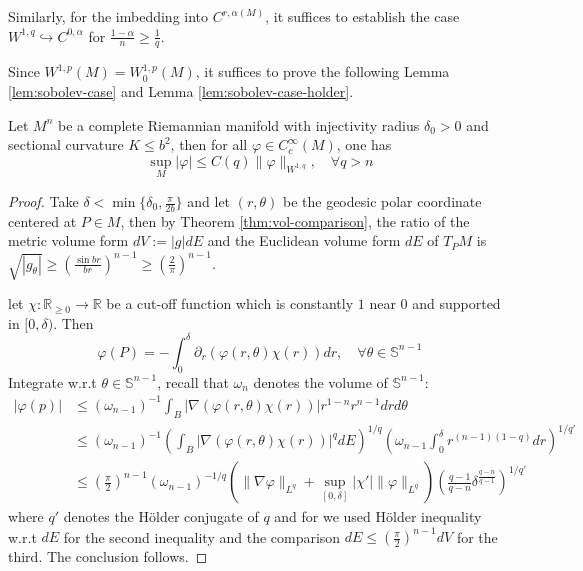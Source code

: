 \documentclass[11pt]{article}
\begin{document}
Similarly, for the imbedding into \(C^{r,\alpha(M)}\), it suffices to establish the case
\(W^{1,q} \hookrightarrow C^{0,\alpha}\) for \(\frac{1-\alpha}{n}\geq \frac{1}{q}\).


Since \(W^{1,p}(M) = W^{1,p}_0(M)\), it suffices to prove the following Lemma
\ref{lem:sobolev-case} and Lemma \ref{lem:sobolev-case-holder}.

\begin{lemma}[\( W^{1,q} \hookrightarrow C^0_B \)]
\label{lem:sobolev-case}
Let \(M^n\) be a complete Riemannian manifold with injectivity radius \(\delta_0>0\)
and sectional curvature \(K\leq b^2\), then for all \(\varphi\in C_c^\infty(M)\), one
has
\[
\sup_M |\varphi| \leq C(q) \|\varphi\|_{W^{1,q}},\quad \forall q>n
\]
\end{lemma}
\begin{proof}
Take \(\delta <\min \{\delta_0, \frac{\pi}{2b}\}\) and let \((r,\theta)\) be the
geodesic polar coordinate centered at \(P\in M\), then by Theorem
\ref{thm:vol-comparison}, the ratio of the metric volume form \(dV:= |g|dE\) and the Euclidean
volume form \(dE\) of \(T_P M\) is \(\sqrt{|g_\theta|}\geq \left(\frac{\sin
br}{br}\right)^{n-1}\geq (\frac{2}{\pi})^{n-1}\). 

let \(\chi: \mathbb{R}_{\geq 0} \longrightarrow \mathbb{R}\) be a cut-off function which
is constantly \(1\) near \(0\) and supported in \([0,\delta)\). Then
\[
 \varphi(P) = -\int_0^\delta
\partial_r\left(\varphi(r,\theta)\chi(r)\right)dr,\quad\forall \theta\in \mathbb{S}^{n-1}
\]
Integrate w.r.t \(\theta\in \mathbb{S}^{n-1}\), recall that \(\omega_n\) denotes the
volume of \(\mathbb{S}^{n-1}\):
\begin{equation*}
\begin{split}
 \left|\varphi(p)\right| &\leq (\omega_{n-1})^{-1} \int_B \left| \nabla(\varphi(r,\theta)\chi(r)) \right| r^{1-n}r^{n-1}drd\theta \\
			&\leq (\omega_{n-1})^{-1} \left(\int_B \left| \nabla(\varphi(r,\theta)\chi(r)) \right|^q dE\right)^{1/q}\left(\omega_{n-1}\int_0^\delta r^{(n-1)(1-q)}dr\right)^{1/q'}\\
			&\leq (\frac{\pi}{2})^{n-1} (\omega_{n-1})^{-1/q} \left(\|\nabla\varphi\|_{L^q} + \sup_{[0,\delta]}|\chi'|\|\varphi\|_{L^q} \right) \left(\frac{q-1}{q-n}\delta^{\frac{q-n}{q-1}}\right)^{1/q'}
\end{split}   
\end{equation*}
where   \(q'\) denotes the Hölder conjugate of \(q\) and for we used Hölder inequality
w.r.t \(dE\) for the second inequality and the comparison \(dE \leq
(\frac{\pi}{2})^{n-1}dV\) for the third. The conclusion follows.
\end{proof}
\end{document}
